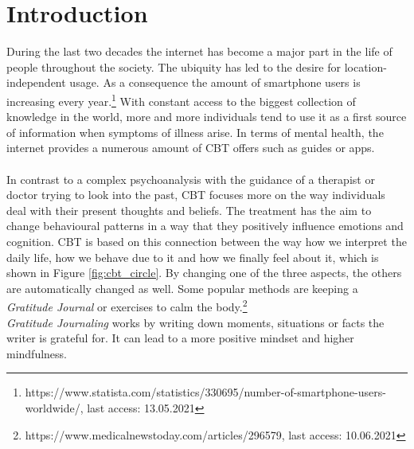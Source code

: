 \documentclass[sigconf, nonacm]{acmart}
\begin{document}
\keywords{}

\maketitle

\section{Introduction}
During the last two decades the internet has become a major part in the life
of people throughout the society. The ubiquity has led to the desire for 
location-independent usage. As a consequence the amount of
smartphone users is increasing every year.\footnote{https://www.statista.com/statistics/330695/number-of-smartphone-users-worldwide/, last access: 13.05.2021}
With constant access to the biggest collection of knowledge in the world,
more and more individuals tend to use it as a first source of information when
symptoms of illness arise\cite{Wyatt2015}. 
In terms of mental health, the internet provides a numerous amount of CBT offers such as guides
or apps. 
\\\\
In contrast to a complex psychoanalysis with the guidance of a therapist or doctor trying to look into the past,
CBT focuses more on the way individuals deal with their present thoughts and beliefs. The treatment has the aim to
change behavioural patterns in a way that they positively influence emotions and cognition. CBT is based on this connection
between the way how we interpret the daily life, how we behave due to it and how we finally feel about it, which is shown in Figure \ref{fig:cbt_circle}. By changing one of the three aspects,
the others are automatically changed as well. Some popular methods are keeping a \emph{Gratitude Journal} or exercises to calm the body.\footnote{https://www.medicalnewstoday.com/articles/296579, last access: 10.06.2021}
\\
\emph{Gratitude Journaling} works by writing down moments, situations or facts the writer is grateful for. It can lead to a more positive mindset and higher mindfulness.\cite{Flinchbaugh2012} 
\end{document}
